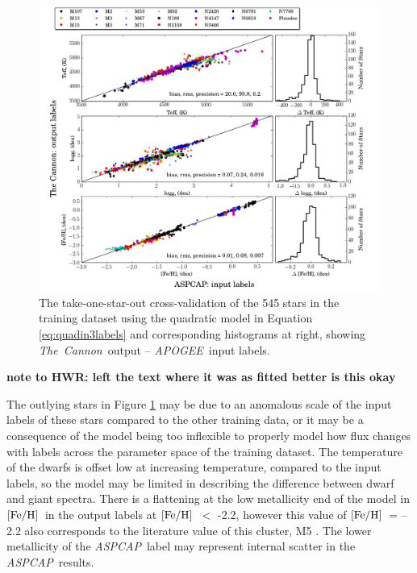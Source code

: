 \documentclass[12pt, preprint]{aastex}
\newcommand{\feh}{\mbox{$\rm [Fe/H]$}}
\newcommand{\tc}{\textsl{The~Cannon}}
\newcommand{\apogee}{\textsl{APOGEE}}
\newcommand{\aspcap}{\textsl{ASPCAP}}
\begin{document}
\begin{figure}[h!]
\centering
    \includegraphics[scale=0.45]{./plots/takeout_histb.png}
\caption{The take-one-star-out cross-validation of the 545 stars in the training dataset using the quadratic model in Equation  \ref{eq:quadin3labels} and corresponding histograms at right, showing \tc\ output -- \apogee\ input labels.}
\label{fig:takeonestarout}
\end{figure}
\textbf{note to HWR: left the text where it was as fitted better is this okay}

The outlying stars in Figure \ref{fig:takeonestarout} may be due to an anomalous scale of the input labels of these stars compared to the other training data, or it may be a consequence of the model being too inflexible to properly model how flux changes with labels across the parameter space of the training dataset. 
The temperature of the dwarfs is offset low at increasing temperature, compared to the input labels, so the model may be limited in describing the difference between dwarf and giant spectra. 
There is a flattening at the low metallicity end of the model in \feh\ in the output labels at \feh\ $<$ -2.2, however this value of \feh\ = --2.2 also corresponds to the literature value of this cluster, M5 \citep{Meszaros2013}. 
The lower metallicity of the \aspcap\ label may represent internal scatter in the \aspcap\ results.
\end{document}
